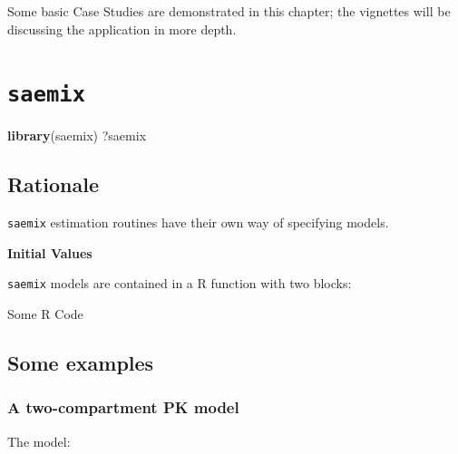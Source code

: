 \documentclass[]{book}
\newenvironment{Shaded}{\begin{snugshade}}{\end{snugshade}}
\newcommand{\KeywordTok}[1]{\textcolor[rgb]{0.13,0.29,0.53}{\textbf{{#1}}}}
\newcommand{\NormalTok}[1]{{#1}}
\begin{document}
Some basic Case Studies are demonstrated in this chapter; the vignettes
will be discussing the application in more depth.

\section{\texorpdfstring{\texttt{saemix}}{saemix}}\label{saemix-1}

\begin{Shaded}
\begin{Highlighting}[]
\KeywordTok{library}\NormalTok{(saemix)}
\NormalTok{?saemix}
\end{Highlighting}
\end{Shaded}

\subsection{Rationale}\label{rationale}

\texttt{saemix} estimation routines have their own way of specifying
models.

\textbf{Initial Values}

\texttt{saemix} models are contained in a R function with two blocks:

\begin{Shaded}
\begin{Highlighting}[]
\NormalTok{Some R Code}
\end{Highlighting}
\end{Shaded}

\subsection{Some examples}\label{some-examples}

\subsubsection{A two-compartment PK
model}\label{a-two-compartment-pk-model}

The model:
\end{document}

